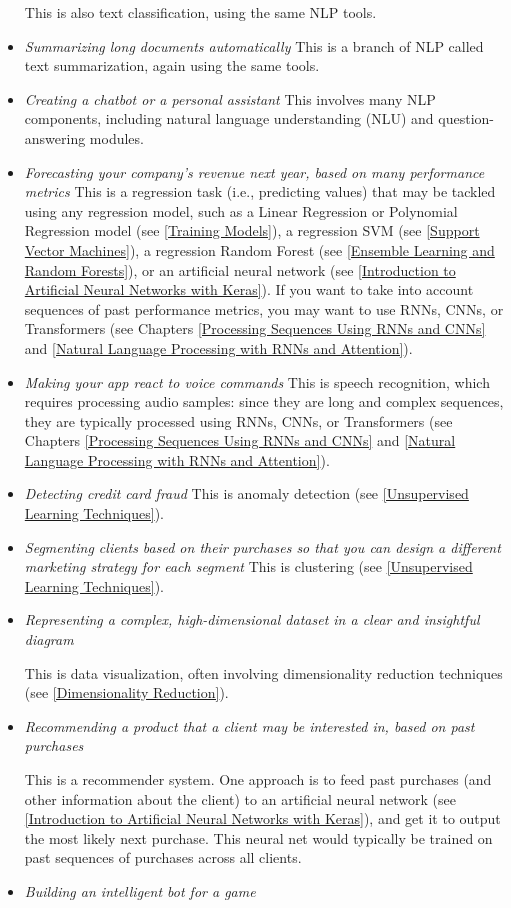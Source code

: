 \begin{itemize}
This is also text classification, using the same NLP tools.
\item
\emph{Summarizing long documents automatically}
This is a branch of NLP called text summarization, again using the same tools.
\item
\emph{Creating a chatbot or a personal assistant}
This involves many NLP components, including natural language understanding
(NLU) and question-answering modules.
\item
\emph{Forecasting your company’s revenue next year, based on many performance metrics}
This is a regression task (i.e., predicting values) that may be tackled using any
regression model, such as a Linear Regression or Polynomial Regression model
(see \autoref{Training Models}), a regression SVM (see \autoref{Support Vector Machines}), a regression Random Forest
(see \autoref{Ensemble Learning and Random Forests}), or an artificial neural network (see \autoref{Introduction to Artificial Neural Networks
with Keras}). If you want to
take into account sequences of past performance metrics, you may want to use
RNNs, CNNs, or Transformers (see Chapters \ref{Processing Sequences Using
RNNs and CNNs} and \ref{Natural Language Processing with
RNNs and Attention}).
\item
\emph{Making your app react to voice commands}
This is speech recognition, which requires processing audio samples: since they
are long and complex sequences, they are typically processed using RNNs, CNNs,
or Transformers (see Chapters \ref{Processing Sequences Using
RNNs and CNNs} and \ref{Natural Language Processing with
RNNs and Attention}).
\item
\emph{Detecting credit card fraud}
This is anomaly detection (see \autoref{Unsupervised Learning Techniques}).
\item
\emph{Segmenting clients based on their purchases so that you can design a different marketing
strategy for each segment}
This is clustering (see \autoref{Unsupervised Learning Techniques}).
\item
\emph{Representing a complex, high-dimensional dataset in a clear and insightful diagram}

This is data visualization, often involving dimensionality reduction techniques
(see \autoref{Dimensionality Reduction}).
\item
\emph{Recommending a product that a client may be interested in, based on past purchases}

This is a recommender system. One approach is to feed past purchases (and
other information about the client) to an artificial neural network (see \autoref{Introduction to Artificial Neural Networks
with Keras}), and get it to output the most likely next purchase. This neural net would
typically be trained on past sequences of purchases across all clients.
\item
\emph{Building an intelligent bot for a game}


\end{itemize}
